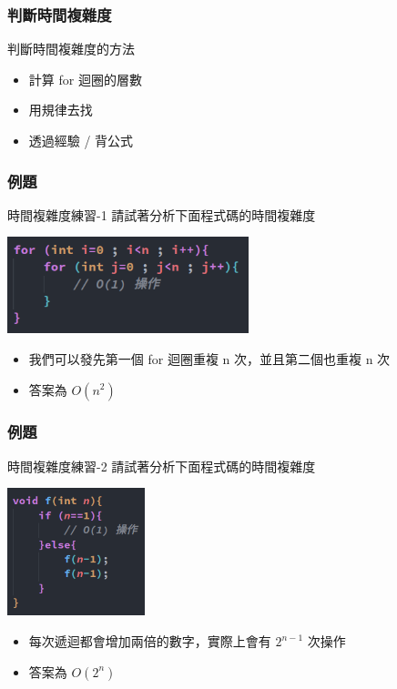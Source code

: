 \documentclass[mathserif]{beamer}
\begin{document}
\begin{frame}
    \frametitle{判斷時間複雜度}
    判斷時間複雜度的方法
    \vspace{0.5cm}
    \begin{itemize}
        \item 計算 for 迴圈的層數
        \item 用規律去找
        \item 透過經驗 / 背公式
    \end{itemize}
\end{frame}

\begin{frame}
    \frametitle{例題}
    \begin{block}{時間複雜度練習-1}
        請試著分析下面程式碼的時間複雜度

        \vspace{0.5cm}
        \includegraphics[width=7.0cm]{img/code_1.png}
    \end{block}
    \begin{itemize}
        \item<2-> 我們可以發先第一個 for 迴圈重複 n 次，並且第二個也重複 n 次
        \item<2-> 答案為 $O(n^2)$
    \end{itemize}
\end{frame}

\begin{frame}
    \frametitle{例題}
    \begin{block}{時間複雜度練習-2}
        請試著分析下面程式碼的時間複雜度

        \vspace{0.5cm}
        \includegraphics[width=4.0cm]{img/code_2.png}
    \end{block}
    \begin{itemize}
        \item<2-> 每次遞迴都會增加兩倍的數字，實際上會有 $2^{n-1}$ 次操作
        \item<2-> 答案為 $O(2^n)$
    \end{itemize}
\end{frame}
\end{document}

